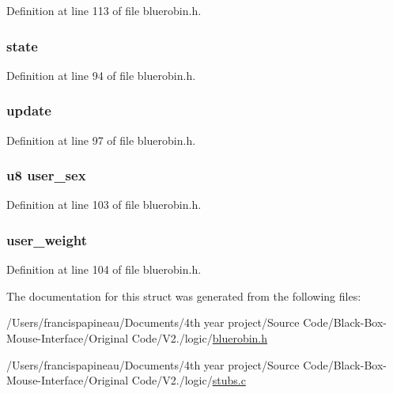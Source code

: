 \-Definition at line 113 of file bluerobin.\-h.

\hypertarget{structbr_a0929ffe8f07d1756ee75c71fb89d12bc}{
\subsubsection[{state}]{ {\bf state}}}\label{structbr_a0929ffe8f07d1756ee75c71fb89d12bc}


\-Definition at line 94 of file bluerobin.\-h.

\hypertarget{structbr_a8cc6727deeda7edbd8a611f7436081ea}{
\subsubsection[{update}]{ {\bf update}}}\label{structbr_a8cc6727deeda7edbd8a611f7436081ea}


\-Definition at line 97 of file bluerobin.\-h.

\hypertarget{structbr_a753dfdbb988f7a6c3cba1da48987c9ba}{
\subsubsection[{user\-\_\-sex}]{\setlength{\rightskip}{0pt plus 5cm}u8 {\bf user\-\_\-sex}}}\label{structbr_a753dfdbb988f7a6c3cba1da48987c9ba}


\-Definition at line 103 of file bluerobin.\-h.

\hypertarget{structbr_afbd1f6401c61aa55759c487e35ad9ff2}{
\subsubsection[{user\-\_\-weight}]{ {\bf user\-\_\-weight}}}\label{structbr_afbd1f6401c61aa55759c487e35ad9ff2}


\-Definition at line 104 of file bluerobin.\-h.



\-The documentation for this struct was generated from the following files\-:\begin{DoxyCompactItemize}
\item 
/\-Users/francispapineau/\-Documents/4th year project/\-Source Code/\-Black-\/\-Box-\/\-Mouse-\/\-Interface/\-Original Code/\-V2./logic/\hyperlink{bluerobin_8h}{bluerobin.\-h}\item 
/\-Users/francispapineau/\-Documents/4th year project/\-Source Code/\-Black-\/\-Box-\/\-Mouse-\/\-Interface/\-Original Code/\-V2./logic/\hyperlink{stubs_8c}{stubs.\-c}\end{DoxyCompactItemize}
